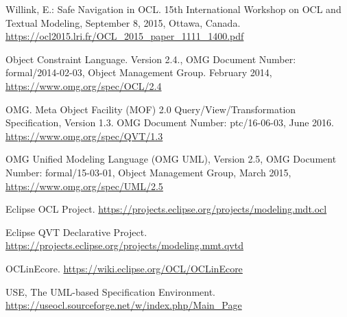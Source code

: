 \documentclass[
]{ceurart}
\begin{document}
\begin{thebibliography}{}
Willink, E.: Safe Navigation in OCL.
15th International Workshop on OCL and Textual Modeling, September 8, 2015, Ottawa, Canada.\\
\url{https://ocl2015.lri.fr/OCL\_2015\_paper\_1111\_1400.pdf}

Object Constraint Language. Version 2.4., OMG Document Number: formal/2014-02-03, Object Management Group. February 2014,  \url{https://www.omg.org/spec/OCL/2.4}

OMG. Meta Object Facility (MOF) 2.0 Query/View/Transformation Specification, Version 1.3.
OMG Document Number: ptc/16-06-03, June 2016.
\url{https://www.omg.org/spec/QVT/1.3}

OMG Unified Modeling Language (OMG UML), Version 2.5, {OMG Document Number}: formal/15-03-01, Object Management Group, March 2015,\\ \url{https://www.omg.org/spec/UML/2.5}

Eclipse OCL Project.
\url{https://projects.eclipse.org/projects/modeling.mdt.ocl}

Eclipse QVT Declarative Project.\\
\url{https://projects.eclipse.org/projects/modeling.mmt.qvtd}

OCLinEcore.
\url{https://wiki.eclipse.org/OCL/OCLinEcore}

USE, The UML-based Specification Environment. \\ \url{https://useocl.sourceforge.net/w/index.php/Main\_Page}

\end{thebibliography}
\end{document}
